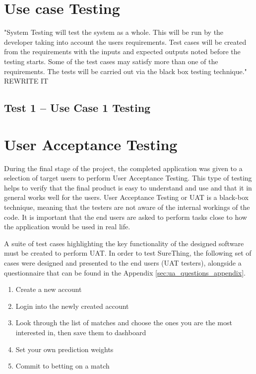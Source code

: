\section{Use case Testing}
\label{sec:usecase_test}
"System Testing will test the system as a whole. This will be run by the developer taking into account the users requirements. Test cases will be created from the requirements with the inputs and expected outputs noted before the testing starts. Some of the test cases may satisfy more than one of the requirements. The tests will be carried out via the black box testing technique." REWRITE IT

\subsection{Test 1 – Use Case 1 Testing}

\section{User Acceptance Testing}
\label{sec:uat_test}
During the final stage of the project, the completed application was given to a selection of target users to perform User Acceptance Testing. This type of testing helps to verify that the final product is easy to understand and use and that it in general works well for the users. User Acceptance Testing or UAT is a black-box technique, meaning that the testers are not aware of the internal workings of the code. It is important that the end users are asked to perform tasks close to how the application would be used in real life.

A suite of test cases highlighting the key functionality of the designed software must be created to perform UAT. In order to test SureThing, the following set of cases were designed and presented to the end users (UAT testers), alongside a questionnaire that can be found in the Appendix \ref{sec:ua_questions_appendix}.

\begin{enumerate}
  \item Create a new account
  \item Login into the newly created account
  \item Look through the list of matches and choose the ones you are the most interested in, then save them to dashboard
  \item Set your own prediction weights
  \item Commit to betting on a match
\end{enumerate}

